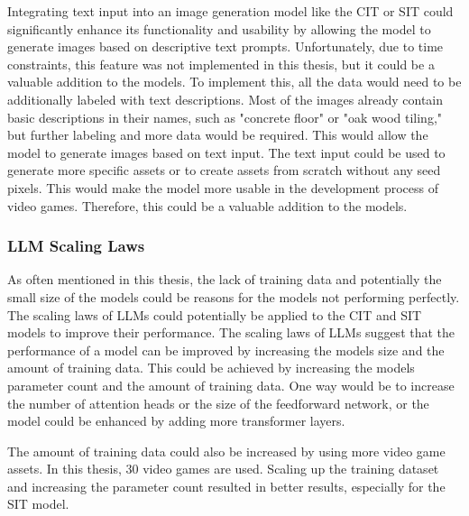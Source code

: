     Integrating text input into an image generation model like the CIT or SIT could significantly enhance its functionality and usability by allowing the model to generate images based on descriptive text prompts. Unfortunately, due to time constraints, this feature was not implemented in this thesis, but it could be a valuable addition to the models. To implement this, all the data would need to be additionally labeled with text descriptions. Most of the images already contain basic descriptions in their names, such as "concrete floor" or "oak wood tiling," but further labeling and more data would be required. This would allow the model to generate images based on text input. The text input could be used to generate more specific assets or to create assets from scratch without any seed pixels. This would make the model more usable in the development process of video games. Therefore, this could be a valuable addition to the models.

    \subsubsection{LLM Scaling Laws}

    As often mentioned in this thesis, the lack of training data and potentially the small size of the models could be reasons for the models not performing perfectly. The scaling laws of LLMs \autocite{kaplan2020scaling} could potentially be applied to the CIT and SIT models to improve their performance. The scaling laws of LLMs suggest that the performance of a model can be improved by increasing the models size and the amount of training data. This could be achieved by increasing the models parameter count and the amount of training data. One way would be to increase the number of attention heads or the size of the feedforward network, or the model could be enhanced by adding more transformer layers. 
    
    The amount of training data could also be increased by using more video game assets. In this thesis, 30 video games are used. Scaling up the training dataset and increasing the parameter count resulted in better results, especially for the SIT model.
